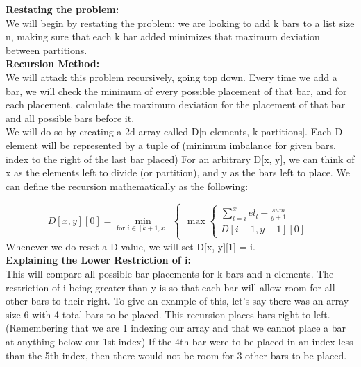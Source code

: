 \documentclass[11pt, solution, letterpaper]{format}
\begin{document}
\textbf{Restating the problem:}\\
We will begin by restating the problem: we are looking to add k bars to a list size n, making sure that each k bar added minimizes that maximum deviation between partitions. \\

\textbf{Recursion Method:}\\
We will attack this problem recursively, going top down. Every time we add a bar, we will check the minimum of every possible placement of that bar, and for each placement, calculate the maximum deviation for the placement of that bar and all possible bars before it.\\

We will do so by creating a 2d array called D[n elements, k partitions]. Each D element will be represented by a tuple of (minimum imbalance for given bars, index to the right of the last bar placed) For an arbitrary D[x, y], we can think of x as the elements left to divide (or partition), and y as the bars left to place. We can define the recursion mathematically as the following:

 \[
  D[x, y][0] = \min_{\text{for } i \in [k + 1, x]} 
  \begin{cases}
                                   \max \begin{cases}
                    \sum_{l=i}^{x} el_l -  \frac{sum}{y + 1}          \\D[i - 1, y - 1][0]
  \end{cases}  
  \end{cases}
\]
Whenever we do reset a D value, we will set D[x, y][1] = i.\\

\textbf{Explaining the Lower Restriction of i:}\\
This will compare all possible bar placements for k bars and n elements. The restriction of i being greater than y is so that each bar will allow room for all other bars to their right. To give an example of this, let's say there was an array size 6 with 4 total bars to be placed. This recursion places bars right to left. (Remembering that we are 1 indexing our array and that we cannot place a bar at anything below our 1st index) If the 4th bar were to be placed in an index less than the 5th index, then there would not be room for 3 other bars to be placed.\\
\end{document}
